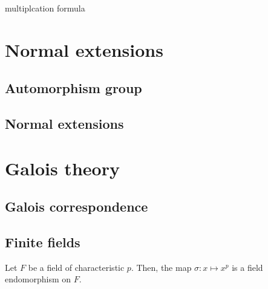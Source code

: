 \documentclass{../exp}
\begin{document}
multiplcation formula












\section{Normal extensions}
\subsection{Automorphism group}

\subsection{Normal extensions}









\section{Galois theory}
\subsection{Galois correspondence}


\subsection{Finite fields}
\begin{lem}
Let $F$ be a field of characteristic $p$.
Then, the map $\sigma:x\mapsto x^p$ is a field endomorphism on $F$.
\end{lem}
\end{document}
